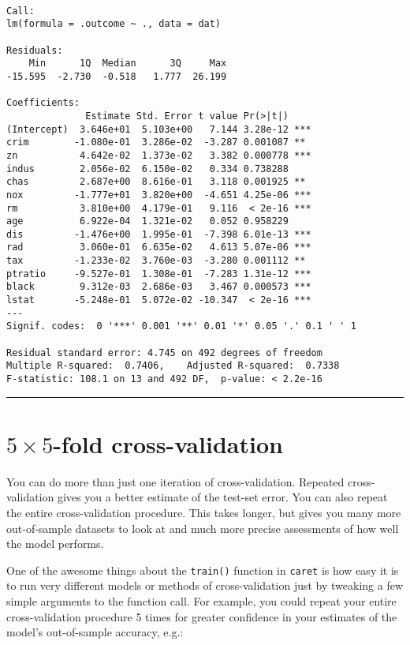 \documentclass[
]{book}
\begin{document}
\begin{verbatim}

Call:
lm(formula = .outcome ~ ., data = dat)

Residuals:
    Min      1Q  Median      3Q     Max 
-15.595  -2.730  -0.518   1.777  26.199 

Coefficients:
              Estimate Std. Error t value Pr(>|t|)    
(Intercept)  3.646e+01  5.103e+00   7.144 3.28e-12 ***
crim        -1.080e-01  3.286e-02  -3.287 0.001087 ** 
zn           4.642e-02  1.373e-02   3.382 0.000778 ***
indus        2.056e-02  6.150e-02   0.334 0.738288    
chas         2.687e+00  8.616e-01   3.118 0.001925 ** 
nox         -1.777e+01  3.820e+00  -4.651 4.25e-06 ***
rm           3.810e+00  4.179e-01   9.116  < 2e-16 ***
age          6.922e-04  1.321e-02   0.052 0.958229    
dis         -1.476e+00  1.995e-01  -7.398 6.01e-13 ***
rad          3.060e-01  6.635e-02   4.613 5.07e-06 ***
tax         -1.233e-02  3.760e-03  -3.280 0.001112 ** 
ptratio     -9.527e-01  1.308e-01  -7.283 1.31e-12 ***
black        9.312e-03  2.686e-03   3.467 0.000573 ***
lstat       -5.248e-01  5.072e-02 -10.347  < 2e-16 ***
---
Signif. codes:  0 '***' 0.001 '**' 0.01 '*' 0.05 '.' 0.1 ' ' 1

Residual standard error: 4.745 on 492 degrees of freedom
Multiple R-squared:  0.7406,    Adjusted R-squared:  0.7338 
F-statistic: 108.1 on 13 and 492 DF,  p-value: < 2.2e-16
\end{verbatim}

\begin{center}\rule{0.5\linewidth}{0.5pt}\end{center}

\hypertarget{times-5-fold-cross-validation}{%
\section{\texorpdfstring{\(5 \times 5\)-fold cross-validation}{5 \textbackslash times 5-fold cross-validation}}\label{times-5-fold-cross-validation}}

You can do more than just one iteration of cross-validation. Repeated cross-validation gives you a better estimate of the test-set error. You can also repeat the entire cross-validation procedure. This takes longer, but gives you many more out-of-sample datasets to look at and much more precise assessments of how well the model performs.

One of the awesome things about the \texttt{train()} function in \texttt{caret} is how easy it is to run very different models or methods of cross-validation just by tweaking a few simple arguments to the function call. For example, you could repeat your entire cross-validation procedure 5 times for greater confidence in your estimates of the model's out-of-sample accuracy, e.g.:
\end{document}
